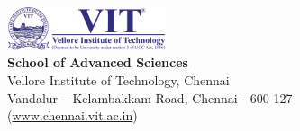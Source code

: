 %
\clearpage 
\thispagestyle{empty}
\vspace*{\fill}
\begin{flushright}
	\linespread{1}\selectfont
	\includegraphics[width=0.35\textwidth]{img/vitlogo.png}\\[0.5cm]
	{\large \bf \sf  School of Advanced Sciences \ }\\
	{\sf Vellore Institute of Technology, Chennai\\
		Vandalur -- Kelambakkam Road, Chennai - 600 127\\
		(\url{www.chennai.vit.ac.in})}
\end{flushright}
%